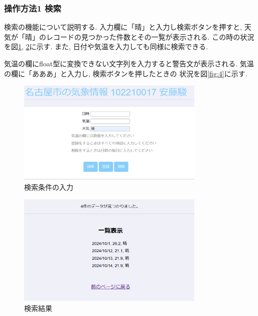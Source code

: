 \documentclass{ltjsarticle} %
\begin{document}
\subsubsection{操作方法1 検索}
検索の機能について説明する. 入力欄に「晴」と入力し検索ボタンを押すと, 天気が「晴」のレコードの見つかった件数とその一覧が表示される. 
この時の状況を図\ref{fig:2}, \ref{fig:3}に示す. また, 日付や気温を入力しても同様に検索できる. 

気温の欄にfloat型に変換できない文字列を入力すると警告文が表示される. 気温の欄に「あああ」と入力し, 検索ボタンを押したときの
状況を図\ref{fig:4}に示す. 

\begin{figure}[H] %
  \centering
  \includegraphics[width=0.8\textwidth]{2.png} %
  \caption{検索条件の入力} %
  \label{fig:2} %
\end{figure}

\begin{figure}[H] %
  \centering
  \includegraphics[width=0.8\textwidth]{3.png} %
  \caption{検索結果} %
  \label{fig:3} %
\end{figure}
\end{document}
